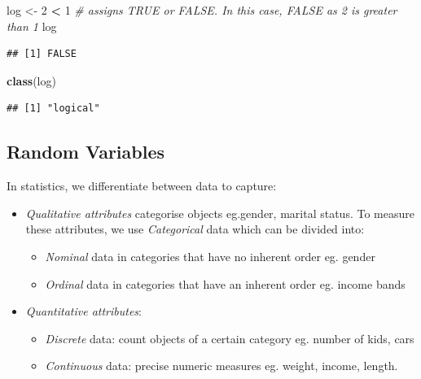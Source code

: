\documentclass[
]{book}
\newenvironment{Shaded}{\begin{snugshade}}{\end{snugshade}}
\newcommand{\CommentTok}[1]{\textcolor[rgb]{0.56,0.35,0.01}{\textit{#1}}}
\newcommand{\DecValTok}[1]{\textcolor[rgb]{0.00,0.00,0.81}{#1}}
\newcommand{\KeywordTok}[1]{\textcolor[rgb]{0.13,0.29,0.53}{\textbf{#1}}}
\newcommand{\NormalTok}[1]{#1}
\newcommand{\OperatorTok}[1]{\textcolor[rgb]{0.81,0.36,0.00}{\textbf{#1}}}
\newcommand{\StringTok}[1]{\textcolor[rgb]{0.31,0.60,0.02}{#1}}
\providecommand{\tightlist}{%
  \setlength{\itemsep}{0pt}\setlength{\parskip}{0pt}}
\begin{document}
\begin{Shaded}
\begin{Highlighting}[]
\NormalTok{log <-}\StringTok{ }\DecValTok{2} \OperatorTok{<}\StringTok{ }\DecValTok{1} \CommentTok{# assigns TRUE or FALSE. In this case, FALSE as 2 is greater than 1}
\NormalTok{log}
\end{Highlighting}
\end{Shaded}

\begin{verbatim}
## [1] FALSE
\end{verbatim}

\begin{Shaded}
\begin{Highlighting}[]
\KeywordTok{class}\NormalTok{(log)}
\end{Highlighting}
\end{Shaded}

\begin{verbatim}
## [1] "logical"
\end{verbatim}

\hypertarget{random-variables}{%
\subsection{Random Variables}\label{random-variables}}

In statistics, we differentiate between data to capture:

\begin{itemize}
\item
  \emph{Qualitative attributes} categorise objects eg.gender, marital status. To measure these attributes, we use \emph{Categorical} data which can be divided into:

  \begin{itemize}
  \tightlist
  \item
    \emph{Nominal} data in categories that have no inherent order eg. gender
  \item
    \emph{Ordinal} data in categories that have an inherent order eg. income bands
  \end{itemize}
\item
  \emph{Quantitative attributes}:

  \begin{itemize}
  \tightlist
  \item
    \emph{Discrete} data: count objects of a certain category eg. number of kids, cars
  \item
    \emph{Continuous} data: precise numeric measures eg. weight, income, length.
  \end{itemize}
\end{itemize}
\end{document}
